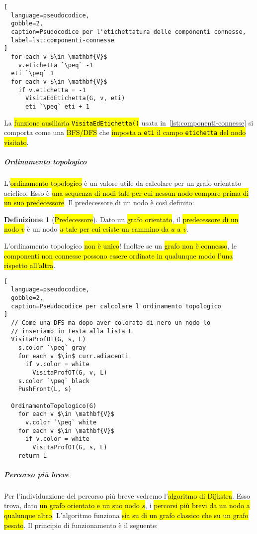 \documentclass[a4paper,11pt,twoside]{article}
\theoremstyle{plain}
\theoremstyle{definition}
\newtheorem{defn}{Definizione}[section]
\theoremstyle{remark}
\newcommand{\peq}{$\gets$}
\begin{document}
\begin{lstlisting}[
  language=pseudocodice,
  gobble=2,
  caption=Psudocodice per l'etichettatura delle componenti connesse,
  label=lst:componenti-connesse
]
  for each v $\in \mathbf{V}$
    v.etichetta `\peq` -1
  eti `\peq` 1
  for each v $\in \mathbf{V}$
    if v.etichetta = -1
      VisitaEdEtichetta(G, v, eti)
      eti `\peq` eti + 1
\end{lstlisting}

\noindent La \hl{funzione ausiliaria \texttt{VisitaEdEtichetta()}} usata
in~\ref{lst:componenti-connesse} si comporta come una \hl{BFS/DFS} che
\hl{imposta a \texttt{eti} il campo \texttt{etichetta} del nodo visitato}.

\subparagraph{Ordinamento topologico} L'\hl{ordinamento topologico} è un valore
utile da calcolare per un grafo orientato aciclico. Esso è \hl{una sequenza di
nodi tale per cui nessun nodo compare prima di un suo predecessore}. Il
predecessore di un nodo è così definito:

\begin{defn}[\hl{Predecessore}]\label{def:graph-predecessor}
  Dato un \hl{grafo orientato}, il \hl{predecessore di un nodo $v$} è un nodo
  \hl{$u$ tale per cui esiste un cammino da $u$ a $v$}.
\end{defn}

\noindent L'ordinamento topologico \hl{non è unico}! Inoltre se un \hl{grafo non
è connesso}, le \hl{componenti non connesse possono essere ordinate in qualunque
modo l'una rispetto all'altra}.

\begin{lstlisting}[
  language=pseudocodice,
  gobble=2,
  caption=Pseudocodice per calcolare l'ordinamento topologico
]
  // Come una DFS ma dopo aver colorato di nero un nodo lo
  // inseriamo in testa alla lista L
  VisitaProfOT(G, s, L)
    s.color `\peq` gray
    for each v $\in$ curr.adiacenti
      if v.color = white
        VisitaProfOT(G, v, L)
    s.color `\peq` black
    PushFront(L, s)

  OrdinamentoTopologico(G)
    for each v $\in \mathbf{V}$
      v.color `\peq` white
    for each v $\in \mathbf{V}$
      if v.color = white
        VisitaProfOT(G, s, L)
    return L
\end{lstlisting}

\subparagraph{Percorso più breve} Per l'individuazione del percorso più breve
vedremo l'\hl{algoritmo di Dijkstra}. Esso trova, dato \hl{un grafo orientato e
un suo nodo $s$}, i \hl{percorsi più brevi da un nodo a qualunque altro}.
L'algoritmo funziona \hl{sia su di un grafo classico che su un grafo pesato}. Il
principio di funzionamento è il seguente:
\end{document}
